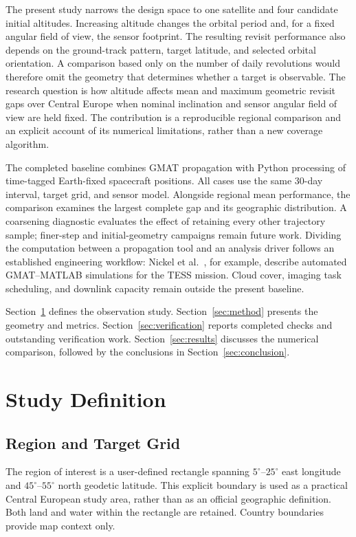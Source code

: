 \documentclass[conf]{new-aiaa}
\begin{document}
The present study narrows the design space to one satellite and four
candidate initial altitudes. Increasing altitude changes the orbital period
and, for a fixed angular field of view, the sensor footprint. The resulting
revisit performance also depends on the ground-track pattern, target
latitude, and selected orbital orientation. A comparison based only on the
number of daily revolutions would therefore omit the geometry that
determines whether a target is observable. The research question is how
altitude affects mean and maximum geometric revisit gaps over Central
Europe when nominal inclination and sensor angular field of view are held
fixed. The contribution is a reproducible regional comparison and an
explicit account of its numerical limitations, rather than a new
coverage algorithm.

The completed baseline combines GMAT propagation with Python processing of
time-tagged Earth-fixed spacecraft positions. All cases use the same
30-day interval, target grid, and sensor model. Alongside regional mean
performance, the comparison examines the largest complete gap and its
geographic distribution. A coarsening diagnostic evaluates the effect of
retaining every other trajectory sample; finer-step and initial-geometry
campaigns remain future work. Dividing the computation between a propagation
tool and an analysis driver follows an established engineering workflow:
Nickel et al.~\cite{nickel2016}, for example, describe automated GMAT--MATLAB
simulations for the TESS mission. Cloud cover, imaging task scheduling, and
downlink capacity remain outside the present baseline.

Section~\ref{sec:definition} defines the observation study.
Section~\ref{sec:method} presents the geometry and metrics.
Section~\ref{sec:verification} reports completed checks and outstanding
verification work. Section~\ref{sec:results} discusses the numerical
comparison, followed by the conclusions in Section~\ref{sec:conclusion}.

\section{Study Definition}
\label{sec:definition}
\subsection{Region and Target Grid}
The region of interest is a user-defined rectangle spanning
$5^{\circ}$--$25^{\circ}$ east longitude and
$45^{\circ}$--$55^{\circ}$ north geodetic latitude. This explicit boundary
is used as a practical Central European study area, rather than as an
official geographic definition. Both land and water within the rectangle
are retained. Country boundaries provide map context only.
\end{document}
